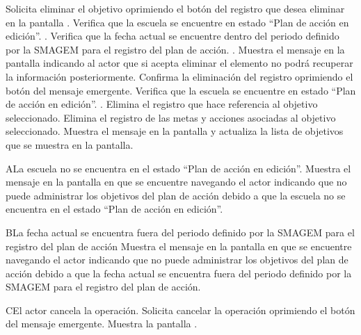  \begin{UCtrayectoria}
\UCpaso[\UCactor] Solicita eliminar el objetivo oprimiendo el botón \botKo  del registro que desea eliminar en la pantalla .
	\UCpaso[\UCsist] Verifica que la escuela se encuentre en  estado ``Plan de acción en edición''. .
    \UCpaso[\UCsist] Verifica que la fecha actual se encuentre dentro del periodo definido por la SMAGEM para el registro del plan de acción. .
\UCpaso[\UCsist] Muestra el mensaje  en la pantalla  indicando al actor que si acepta eliminar 
el elemento no podrá recuperar la información posteriormente.
\UCpaso[\UCactor] Confirma la eliminación del registro oprimiendo el botón  del mensaje emergente. 
	\UCpaso[\UCsist] Verifica que la escuela se encuentre en  estado ``Plan de acción en edición''. .
\UCpaso[\UCsist] Elimina el registro que hace referencia al objetivo seleccionado.
\UCpaso[\UCsist] Elimina el registro de las metas y acciones asociadas al objetivo seleccionado.
\UCpaso[\UCsist] Muestra el mensaje  en la pantalla  
 y actualiza la lista de objetivos que se muestra en la pantalla.
 \end{UCtrayectoria}

\begin{UCtrayectoriaA}{A}{La escuela no se encuentra en el estado ``Plan de acción en edición''.}
    \UCpaso[\UCsist] Muestra el mensaje  en la pantalla en que se encuentre navegando el actor indicando que no puede administrar los objetivos del plan de acción debido a que la escuela no se encuentra en el estado ``Plan de acción en edición''. 
 \end{UCtrayectoriaA}
 
   \begin{UCtrayectoriaA}{B}{La fecha actual se encuentra fuera del periodo definido por la SMAGEM para el registro del plan de acción}
    \UCpaso[\UCsist] Muestra el mensaje  en la pantalla en que se encuentre navegando el actor indicando que no puede administrar los objetivos del plan de acción debido a que la fecha actual se encuentra fuera del periodo definido por la SMAGEM para el registro del plan de acción.
 \end{UCtrayectoriaA} 
 
\begin{UCtrayectoriaA}{C}{El actor cancela la operación.}
	\UCpaso[\UCactor] Solicita cancelar la operación oprimiendo el botón  del mensaje emergente.
	\UCpaso[\UCsist] Muestra la pantalla .
\end{UCtrayectoriaA}
  
